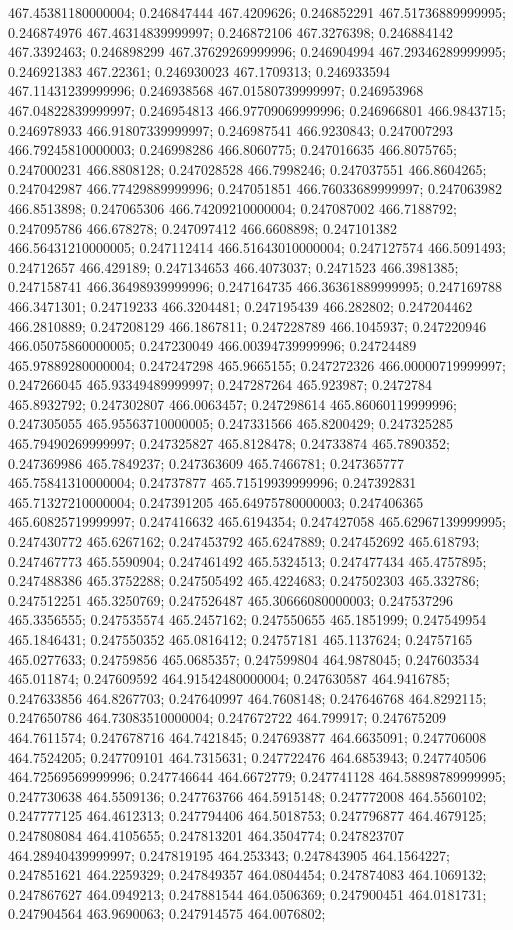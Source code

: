 467.45381180000004; 0.246847444 467.4209626; 0.246852291 467.51736889999995; 0.246874976 467.46314839999997; 0.246872106 467.3276398; 0.246884142 467.3392463; 0.246898299 467.37629269999996; 0.246904994 467.29346289999995; 0.246921383 467.22361; 0.246930023 467.1709313; 0.246933594 467.11431239999996; 0.246938568 467.01580739999997; 0.246953968 467.04822839999997; 0.246954813 466.97709069999996; 0.246966801 466.9843715; 0.246978933 466.91807339999997; 0.246987541 466.9230843; 0.247007293 466.79245810000003; 0.246998286 466.8060775; 0.247016635 466.8075765; 0.247000231 466.8808128; 0.247028528 466.7998246; 0.247037551 466.8604265; 0.247042987 466.77429889999996; 0.247051851 466.76033689999997; 0.247063982 466.8513898; 0.247065306 466.74209210000004; 0.247087002 466.7188792; 0.247095786 466.678278; 0.247097412 466.6608898; 0.247101382 466.56431210000005; 0.247112414 466.51643010000004; 0.247127574 466.5091493; 0.24712657 466.429189; 0.247134653 466.4073037; 0.2471523 466.3981385; 0.247158741 466.36498939999996; 0.247164735 466.36361889999995; 0.247169788 466.3471301; 0.24719233 466.3204481; 0.247195439 466.282802; 0.247204462 466.2810889; 0.247208129 466.1867811; 0.247228789 466.1045937; 0.247220946 466.05075860000005; 0.247230049 466.00394739999996; 0.24724489 465.97889280000004; 0.247247298 465.9665155; 0.247272326 466.00000719999997; 0.247266045 465.93349489999997; 0.247287264 465.923987; 0.2472784 465.8932792; 0.247302807 466.0063457; 0.247298614 465.86060119999996; 0.247305055 465.95563710000005; 0.247331566 465.8200429; 0.247325285 465.79490269999997; 0.247325827 465.8128478; 0.24733874 465.7890352; 0.247369986 465.7849237; 0.247363609 465.7466781; 0.247365777 465.75841310000004; 0.24737877 465.71519939999996; 0.247392831 465.71327210000004; 0.247391205 465.64975780000003; 0.247406365 465.60825719999997; 0.247416632 465.6194354; 0.247427058 465.62967139999995; 0.247430772 465.6267162; 0.247453792 465.6247889; 0.247452692 465.618793; 0.247467773 465.5590904; 0.247461492 465.5324513; 0.247477434 465.4757895; 0.247488386 465.3752288; 0.247505492 465.4224683; 0.247502303 465.332786; 0.247512251 465.3250769; 0.247526487 465.30666080000003; 0.247537296 465.3356555; 0.247535574 465.2457162; 0.247550655 465.1851999; 0.247549954 465.1846431; 0.247550352 465.0816412; 0.24757181 465.1137624; 0.24757165 465.0277633; 0.24759856 465.0685357; 0.247599804 464.9878045; 0.247603534 465.011874; 0.247609592 464.91542480000004; 0.247630587 464.9416785; 0.247633856 464.8267703; 0.247640997 464.7608148; 0.247646768 464.8292115; 0.247650786 464.73083510000004; 0.247672722 464.799917; 0.247675209 464.7611574; 0.247678716 464.7421845; 0.247693877 464.6635091; 0.247706008 464.7524205; 0.247709101 464.7315631; 0.247722476 464.6853943; 0.247740506 464.72569569999996; 0.247746644 464.6672779; 0.247741128 464.58898789999995; 0.247730638 464.5509136; 0.247763766 464.5915148; 0.247772008 464.5560102; 0.247777125 464.4612313; 0.247794406 464.5018753; 0.247796877 464.4679125; 0.247808084 464.4105655; 0.247813201 464.3504774; 0.247823707 464.28940439999997; 0.247819195 464.253343; 0.247843905 464.1564227; 0.247851621 464.2259329; 0.247849357 464.0804454; 0.247874083 464.1069132; 0.247867627 464.0949213; 0.247881544 464.0506369; 0.247900451 464.0181731; 0.247904564 463.9690063; 0.247914575 464.0076802; 